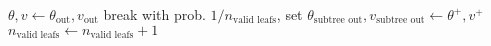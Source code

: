 \documentclass{article}
\begin{document}
\begin{algorithm}
\begin{algorithmic}
			\State $\theta, v \gets \theta_\textrm{out}, v_\textrm{out}$ 
			\State break
		\Else
			 
				\State with prob. $1/n_\textrm{valid leafs}$, set $\theta_\textrm{subtree out}, v_\textrm{subtree out} \gets \theta^+, v^+$ 
				\State $n_\textrm{valid leafs} \gets n_\textrm{valid leafs} + 1$
			\EndIf
		\EndIf
		
	\EndFor
\EndFor
\end{algorithmic}
\end{algorithm}
\end{document}
